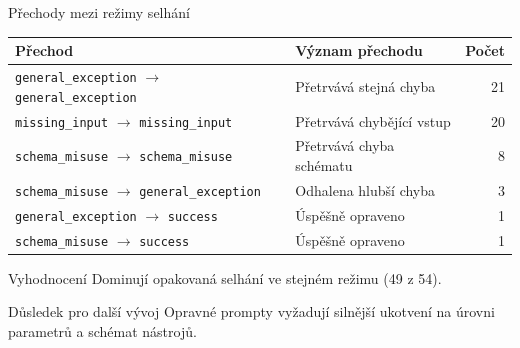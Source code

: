 \documentclass[aspectratio=169,10pt]{beamer}
\begin{document}
\begin{frame}[t]{Přechody mezi režimy selhání}
  \small
  \begin{table}
    \centering
    \begin{tabular}{@{}llr@{}}
      \toprule
      \textbf{Přechod} & \textbf{Význam přechodu} & \textbf{Počet} \\
      \midrule
      \texttt{general\_exception} $\rightarrow$ \texttt{general\_exception}
        & Přetrvává stejná chyba & 21 \\
      \texttt{missing\_input} $\rightarrow$ \texttt{missing\_input}
        & Přetrvává chybějící vstup & 20 \\
      \texttt{schema\_misuse} $\rightarrow$ \texttt{schema\_misuse}
        & Přetrvává chyba schématu & 8 \\
      \texttt{schema\_misuse} $\rightarrow$ \texttt{general\_exception}
        & Odhalena hlubší chyba & 3 \\
      \texttt{general\_exception} $\rightarrow$ \texttt{success}
        & Úspěšně opraveno & 1 \\
      \texttt{schema\_misuse} $\rightarrow$ \texttt{success}
        & Úspěšně opraveno & 1 \\
      \bottomrule
    \end{tabular}
  \end{table}

  \begin{alertblock}{Vyhodnocení}
    Dominují opakovaná selhání ve stejném režimu (49 z 54).
  \end{alertblock}

  \begin{block}{Důsledek pro další vývoj}
    Opravné prompty vyžadují silnější ukotvení na úrovni parametrů a schémat
    nástrojů.
  \end{block}
\end{frame}
\end{document}
